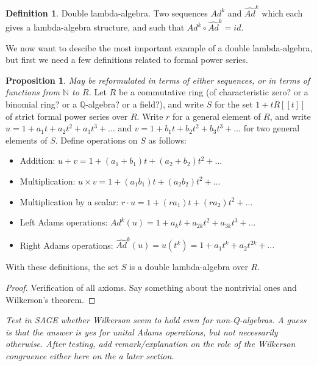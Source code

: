 \documentclass[a4paper]{article}
\theoremstyle{definition}
\newtheorem{definition}{Definition}[section]
\newtheorem{proposition}[theorem]{Proposition}
\theoremstyle{remark}
\newcommand{\N}{\mathbb{N}}
\newcommand{\Q}{\mathbb{Q}}
\begin{document}
 

\begin{definition}
Double lambda-algebra. Two sequences $Ad^k$ and $\widehat{Ad}^k$ which each gives a lambda-algebra structure, and such that $Ad^k \circ \widehat{Ad}^k = id$.
\end{definition}

We now want to descibe the most important example of a double lambda-algebra, but first we need a few definitions related to formal power series.



\begin{proposition}
\emph{May be reformulated in terms of either sequences, or in terms of functions from $\N$ to $R$.}
Let $R$ be a commutative ring (of characteristic zero? or a binomial ring? or a $\Q$-algebra? or a field?), and write $S$ for the set $1+t R[[t]]$ of strict formal power series over $R$. Write $r$ for a general element of $R$, and write $u = 1+a_1 t + a_2 t^2 + a_3 t^3 + \ldots$ and $v = 1+b_1 t + b_2 t^2 + b_3 t^3 + \ldots$ for two general elements of $S$. Define operations on $S$ as follows:
\begin{itemize}
\item Addition: $u+v = 1+ (a_1 + b_1) t + (a_2 + b_2) t^2 + \ldots $
\item Multiplication: $u \times v = 1+ (a_1 b_1) t + (a_2  b_2) t^2 + \ldots$
\item Multiplication by a scalar: $r \cdot u = 1+ (r a_1 ) t + (r a_2 ) t^2 + \ldots$
\item Left Adams operations: $Ad^k(u) = 1 + a_k t + a_{2k} t^2 + a_{3k} t^3 + \ldots$
\item Right Adams operations: $\hat{Ad}^k(u) = u (t^k) = 1+a_1 t^k + a_2 t^{2k} + \ldots$
\end{itemize}
With these definitions, the set $S$ is a double lambda-algebra over $R$.
\end{proposition}

\begin{proof}
Verification of all axioms. Say something about the nontrivial ones and Wilkerson's theorem.
\end{proof}

\emph{Test in SAGE whether Wilkerson seem to hold even for non-Q-algebras. A guess is that the answer is yes for unital Adams operations, but not necessarily otherwise. After testing, add remark/explanation on the role of the Wilkerson congruence either here on the a later section.}
\end{document}
